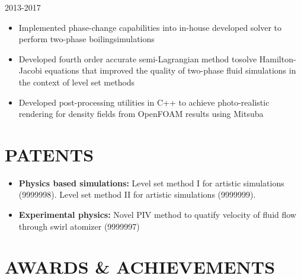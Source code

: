 \documentclass{res}
\begin{document}
\begin{resume}
	\hspace*{-0.25in}{\bf Research Assistant} \hfill 2013-2017 \\
	\hspace*{-0.25in}{\it University of Wisconsin-Madison, Madison, WI}
	\begin{itemize}[leftmargin=\parindent]
	\setlength{\itemsep}{0mm} \smallskip
	
		\item Implemented phase-change capabilities into in-house developed solver to perform two-phase boilingsimulations
		\item Developed fourth order accurate semi-Lagrangian method tosolve Hamilton-Jacobi equations that improved the quality of two-phase fluid simulations in the context of level set methods
		\item Developed post-processing utilities in C++ to achieve photo-realistic rendering for density fields from OpenFOAM results using Mitsuba
	\end{itemize}
	
	
	
	
	\section{\MakeUppercase{Patents}} \vskip 0.35in
	\begin{itemize}[leftmargin=\parindent]
	\setlength{\itemsep}{6pt}
	
		\item[] {\bf Physics based simulations:} Level set method I for artistic simulations (9999998). Level set method II for artistic simulations (9999999).
		\item[] {\bf Experimental physics:} Novel PIV method to quatify velocity of fluid flow through swirl atomizer (9999997)
	\end{itemize}
	
		
	
	\section{\MakeUppercase{Awards \& Achievements}} \vskip 0.35in
	\begin{itemize}[leftmargin=\parindent]
	\setlength{\itemsep}{0mm}
	

\end{itemize}
\end{resume}
\end{document}
